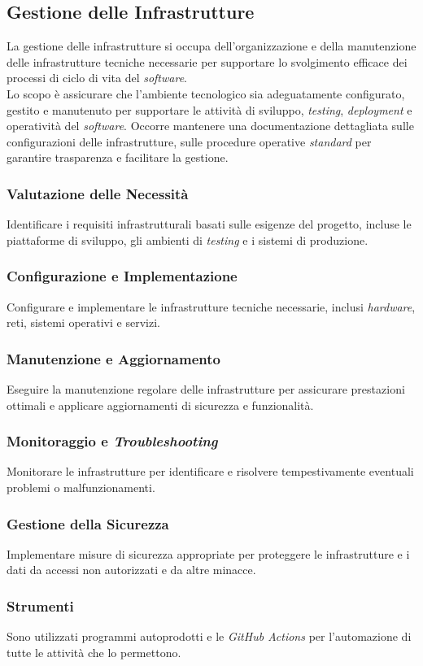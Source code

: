 \subsection{Gestione delle Infrastrutture}

La gestione delle infrastrutture si occupa dell'organizzazione e della
manutenzione delle infrastrutture tecniche necessarie per supportare lo
svolgimento efficace dei processi di ciclo di vita del \textit{software}.\\
Lo scopo è assicurare che l'ambiente tecnologico sia adeguatamente configurato, gestito e
manutenuto per supportare le attività di sviluppo, \textit{testing},
\textit{deployment} e operatività del \textit{software}.
Occorre mantenere una documentazione dettagliata sulle configurazioni delle
infrastrutture, sulle procedure operative \textit{standard} per garantire trasparenza e
facilitare la gestione.


\subsubsection{Valutazione delle Necessità} 
Identificare i requisiti
	  infrastrutturali basati sulle esigenze del progetto, incluse le
	  piattaforme di sviluppo, gli ambienti di \textit{testing} e i sistemi
	  di produzione.

\subsubsection{Configurazione e Implementazione} 
Configurare e implementare
	  le infrastrutture tecniche necessarie, inclusi \textit{hardware},
	  reti, sistemi operativi e servizi.

\subsubsection{Manutenzione e Aggiornamento} 
Eseguire la manutenzione
	  regolare delle infrastrutture per assicurare prestazioni ottimali e
	  applicare aggiornamenti di sicurezza e funzionalità.
	  
\subsubsection{Monitoraggio e \textit{Troubleshooting}} 
Monitorare le
	  infrastrutture per identificare e risolvere tempestivamente eventuali
	  problemi o malfunzionamenti.

\subsubsection{Gestione della Sicurezza} 
Implementare misure di sicurezza
	  appropriate per proteggere le infrastrutture e i dati da accessi non
	  autorizzati e da altre minacce.

\subsubsection{Strumenti}
Sono utilizzati programmi autoprodotti e le \textit{GitHub Actions} per
l'automazione di tutte le attività che lo permettono.
